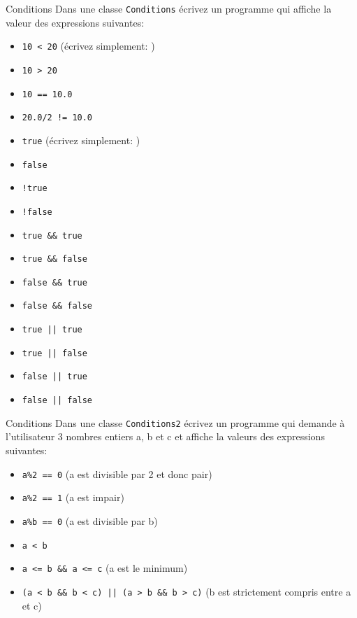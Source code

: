 \documentclass[a4paper,11pt]{article}
\begin{document}
	\begin{Exercice}{Conditions}
		Dans une classe \texttt{Conditions} écrivez un programme qui affiche la valeur des expressions suivantes:
		\begin{itemize}
			\item \texttt{10 < 20} (écrivez simplement: )
			\item \texttt{10 > 20}
			\item \texttt{10 == 10.0}
			\item \texttt{20.0/2 != 10.0}
			\item \texttt{true}  (écrivez simplement: )
			\item \texttt{false} 
			\item \texttt{!true} 
			\item \texttt{!false} 
			\item \texttt{true \&\& true} 
			\item \texttt{true \&\& false} 
			\item \texttt{false \&\& true} 
			\item \texttt{false \&\& false} 
			\item \texttt{true || true} 
			\item \texttt{true || false} 
			\item \texttt{false || true} 
			\item \texttt{false || false} 
		\end{itemize}
	\end{Exercice}

	\begin{Exercice}{Conditions}
		Dans une classe \texttt{Conditions2} écrivez un programme qui demande à l'utilisateur 
		3 nombres entiers a, b et c et affiche la valeurs des expressions suivantes:
		\begin{itemize}
			\item \texttt{a\%2 == 0}  (a est divisible par 2 et donc pair)
			\item \texttt{a\%2 == 1}  (a est impair)
			\item \texttt{a\%b == 0}  (a est divisible par b)
			\item \texttt{a < b}
			\item \texttt{a <= b \&\& a <= c} (a est le minimum)
			\item \texttt{(a < b \&\& b < c) || (a > b \&\& b > c)} (b est strictement compris entre a et c)
		\end{itemize}
	\end{Exercice}
\end{document}
